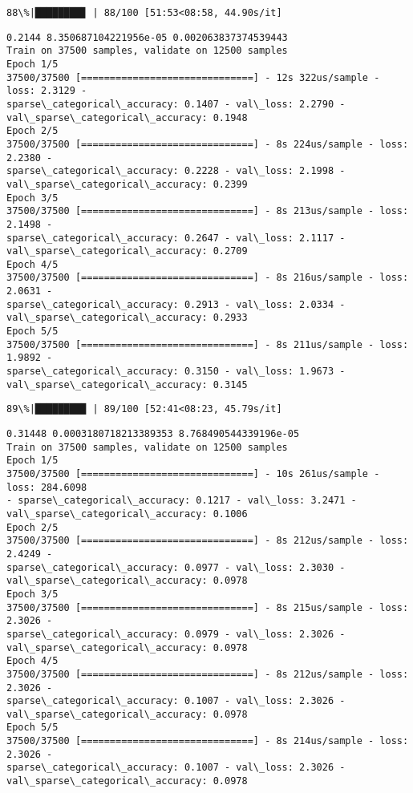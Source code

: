 \documentclass[11pt]{article}
\begin{document}
    \begin{Verbatim}[commandchars=\\\{\}]
 88\%|████████▊ | 88/100 [51:53<08:58, 44.90s/it]
    \end{Verbatim}

    \begin{Verbatim}[commandchars=\\\{\}]
0.2144 8.350687104221956e-05 0.002063837374539443
Train on 37500 samples, validate on 12500 samples
Epoch 1/5
37500/37500 [==============================] - 12s 322us/sample - loss: 2.3129 -
sparse\_categorical\_accuracy: 0.1407 - val\_loss: 2.2790 -
val\_sparse\_categorical\_accuracy: 0.1948
Epoch 2/5
37500/37500 [==============================] - 8s 224us/sample - loss: 2.2380 -
sparse\_categorical\_accuracy: 0.2228 - val\_loss: 2.1998 -
val\_sparse\_categorical\_accuracy: 0.2399
Epoch 3/5
37500/37500 [==============================] - 8s 213us/sample - loss: 2.1498 -
sparse\_categorical\_accuracy: 0.2647 - val\_loss: 2.1117 -
val\_sparse\_categorical\_accuracy: 0.2709
Epoch 4/5
37500/37500 [==============================] - 8s 216us/sample - loss: 2.0631 -
sparse\_categorical\_accuracy: 0.2913 - val\_loss: 2.0334 -
val\_sparse\_categorical\_accuracy: 0.2933
Epoch 5/5
37500/37500 [==============================] - 8s 211us/sample - loss: 1.9892 -
sparse\_categorical\_accuracy: 0.3150 - val\_loss: 1.9673 -
val\_sparse\_categorical\_accuracy: 0.3145
    \end{Verbatim}

    \begin{Verbatim}[commandchars=\\\{\}]
 89\%|████████▉ | 89/100 [52:41<08:23, 45.79s/it]
    \end{Verbatim}

    \begin{Verbatim}[commandchars=\\\{\}]
0.31448 0.0003180718213389353 8.768490544339196e-05
Train on 37500 samples, validate on 12500 samples
Epoch 1/5
37500/37500 [==============================] - 10s 261us/sample - loss: 284.6098
- sparse\_categorical\_accuracy: 0.1217 - val\_loss: 3.2471 -
val\_sparse\_categorical\_accuracy: 0.1006
Epoch 2/5
37500/37500 [==============================] - 8s 212us/sample - loss: 2.4249 -
sparse\_categorical\_accuracy: 0.0977 - val\_loss: 2.3030 -
val\_sparse\_categorical\_accuracy: 0.0978
Epoch 3/5
37500/37500 [==============================] - 8s 215us/sample - loss: 2.3026 -
sparse\_categorical\_accuracy: 0.0979 - val\_loss: 2.3026 -
val\_sparse\_categorical\_accuracy: 0.0978
Epoch 4/5
37500/37500 [==============================] - 8s 212us/sample - loss: 2.3026 -
sparse\_categorical\_accuracy: 0.1007 - val\_loss: 2.3026 -
val\_sparse\_categorical\_accuracy: 0.0978
Epoch 5/5
37500/37500 [==============================] - 8s 214us/sample - loss: 2.3026 -
sparse\_categorical\_accuracy: 0.1007 - val\_loss: 2.3026 -
val\_sparse\_categorical\_accuracy: 0.0978
    \end{Verbatim}
\end{document}
